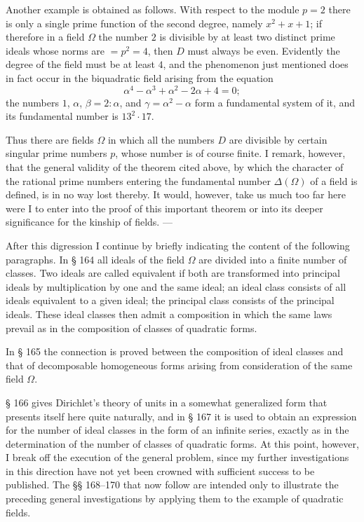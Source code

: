 \documentclass[11pt]{article}
\newcommand{\origpage}[1]{\par\vspace{0.25em}\noindent{\footnotesize\itshape [Printed page #1]}\par\vspace{0.25em}}
\begin{document}
Another example is obtained as follows. With respect to the module $p=2$ there is only a single prime function of the second degree, namely $x^2+x+1$; if therefore in a field $\Omega$ the number $2$ is divisible by at least two distinct prime ideals whose norms are $=p^2=4$, then $D$ must always be even. Evidently the degree of the field must be at least $4$, and the phenomenon just mentioned does in fact occur in the biquadratic field arising from the equation
\[
\alpha^4-\alpha^3+\alpha^2-2\alpha+4=0;
\]
the numbers $1$, $\alpha$, $\beta=2:\alpha$, and $\gamma=\alpha^2-\alpha$ form a fundamental system of it, and its fundamental number is $13^2\cdot17$.

Thus there are fields $\Omega$ in which all the numbers $D$ are divisible by certain singular prime numbers $p$, whose number is of course finite. I remark, however, that the general validity of the theorem cited above, by which the character of the rational prime numbers entering the fundamental number $\Delta(\Omega)$ of a field is defined, is in no way lost thereby. It would, however, take us much too far here were I to enter into the proof of this important theorem or into its deeper significance for the kinship of fields. ---

After this digression I continue by briefly indicating the content of the following paragraphs. In § 164 all ideals of the field $\Omega$ are divided into a finite number of classes. Two ideals are called equivalent if both are transformed into principal ideals by multiplication by one and the same ideal; an ideal class consists of all ideals equivalent to a given ideal; the principal class consists of the principal ideals. These ideal classes then admit a composition in which the same laws prevail as in the composition of classes of quadratic forms.

\origpage{407}
In § 165 the connection is proved between the composition of ideal classes and that of decomposable homogeneous forms arising from consideration of the same field $\Omega$.

§ 166 gives Dirichlet's theory of units in a somewhat generalized form that presents itself here quite naturally, and in § 167 it is used to obtain an expression for the number of ideal classes in the form of an infinite series, exactly as in the determination of the number of classes of quadratic forms. At this point, however, I break off the execution of the general problem, since my further investigations in this direction have not yet been crowned with sufficient success to be published. The §§ 168--170 that now follow are intended only to illustrate the preceding general investigations by applying them to the example of quadratic fields.
\end{document}
